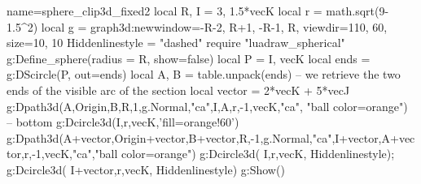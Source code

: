 \documentclass[border=5pt]{standalone}
\begin{document}
\begin{luadraw}{name=sphere_clip3d_fixed2}
local R, I = 3, 1.5*vecK
local r = math.sqrt(9-1.5^2)
local g = graph3d:new{window={-R-2, R+1, -R-1, R}, viewdir={110, 60}, size={10, 10}}
Hiddenlinestyle = "dashed"
require "luadraw_spherical"
g:Define_sphere({radius = R, show=false})
local P = {I, vecK}
local ends = {}
g:DScircle(P, {out=ends})
local A, B = table.unpack(ends) -- we retrieve the two ends of the visible arc of the section
local vector = 2*vecK + 5*vecJ 
g:Dpath3d({A,Origin,B,R,1,g.Normal,"ca",I,A,r,-1,vecK,"ca"}, "ball color=orange") -- bottom
g:Dcircle3d(I,r,vecK,'fill=orange!60')
g:Dpath3d({A+vector,Origin+vector,B+vector,R,-1,g.Normal,"ca",I+vector,A+vector,r,-1,vecK,"ca"},"ball color=orange")
g:Dcircle3d( I,r,vecK, Hiddenlinestyle); g:Dcircle3d( I+vector,r,vecK, Hiddenlinestyle)
g:Show()
\end{luadraw}
\end{document}
